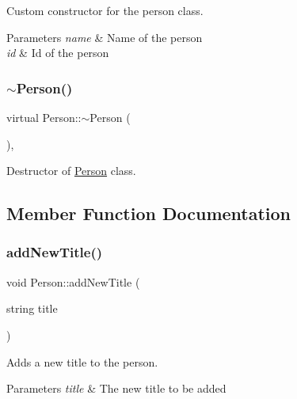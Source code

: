 Custom constructor for the person class. 


\begin{DoxyParams}{Parameters}
{\em name} & Name of the person \\
\hline
{\em id} & Id of the person \\
\hline
\end{DoxyParams}
\mbox{\label{class_person_a6b5729bb56531c93312b1179c8ee4b71}} 
\subsubsection{\texorpdfstring{$\sim$\+Person()}{~Person()}}
{\footnotesize\ttfamily virtual Person\+::$\sim$\+Person (\begin{DoxyParamCaption}{ }\end{DoxyParamCaption})\hspace{0.3cm}{\ttfamily [inline]}, {\ttfamily [virtual]}}



Destructor of \hyperlink{class_person}{Person} class. 



\subsection{Member Function Documentation}
\mbox{\label{class_person_a1f6361e735885ead2549717bb31d0437}} 
\subsubsection{\texorpdfstring{add\+New\+Title()}{addNewTitle()}}
{\footnotesize\ttfamily void Person\+::add\+New\+Title (\begin{DoxyParamCaption}\item[{string}]{title }\end{DoxyParamCaption})\hspace{0.3cm}{\ttfamily [virtual]}}



Adds a new title to the person. 


\begin{DoxyParams}{Parameters}
{\em title} & The new title to be added \\
\hline
\end{DoxyParams}


